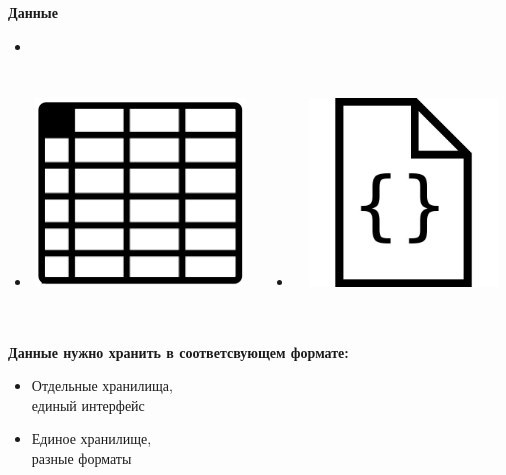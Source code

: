 \documentclass[18pt, compress, aspectratio=169]{beamer}
\begin{document}
\begin{frame}[fragile]
    \frametitle{}
    \begin{center}
        \textbf{Данные}
    \end{center}
    \begin{itemize}[leftmargin=*]
        \item <+->
    \end{itemize}

    \vspace{-40pt}

    \begin{columns}[T,onlytextwidth]
    \begin{itemize}[leftmargin=*]
        \item <+->\includegraphics[width=6cm,height=5cm]{relation.png}
    \end{itemize}

    \vspace{20pt}

    \begin{itemize}[leftmargin=*]
        \item <+->\includegraphics[width=6cm,height=5cm]{document.jpg}
    \end{itemize}
    \end{columns}
\end{frame}

\begin{frame}
    \frametitle{}
    \begin{center}
        \textbf{Данные нужно хранить в соответсвующем формате:}
        \pause
        \begin{itemize}[label={\MVRightarrow}]
            \item <+-> Отдельные хранилища,\\ единый интерфейс
            \item <+-> Единое хранилище,\\ разные форматы
        \end{itemize}
    \end{center}
\end{frame}
\end{document}
